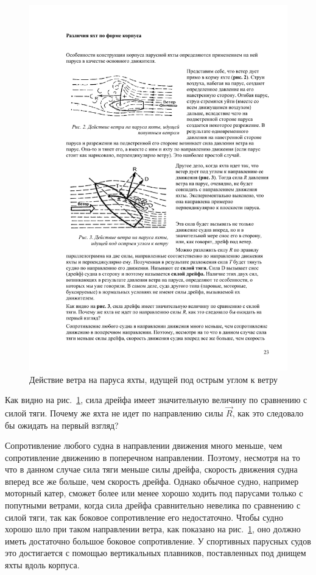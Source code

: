 \documentclass[a4paper, 12pt, twoside, final]{scrbook}
\begin{document}
\begin{figure}%
\centering
\includegraphics{pics/Deystvie_vetra_ostryy_ugol}
\protect\caption{\label{fig:Deystvie_vetra_ostryy_ugol}Действие
ветра на паруса яхты, идущей под острым углом к ветру}
\end{figure}%

Как видно на рис.~\ref{fig:Deystvie_vetra_ostryy_ugol},
сила дрейфа имеет значительную величину по сравнению с силой тяги.
Почему же яхта не идет по направлению силы $\overrightarrow{R}$, как это следовало
бы ожидать на первый взгляд?

Сопротивление любого судна в направлении движения много меньше, чем
сопротивление движению в поперечном направлении. Поэтому, несмотря
на то что в данном случае сила тяги меньше силы дрейфа, скорость движения
судна вперед все же больше, чем скорость дрейфа. Однако обычное судно,
например моторный катер, сможет более или менее хорошо ходить под
парусами только с попутными ветрами, когда сила дрейфа сравнительно
невелика по сравнению с силой тяги, так как боковое сопротивление
его недостаточно. Чтобы судно хорошо шло при таком направлении ветра,
как показано на рис.~\ref{fig:Deystvie_vetra_ostryy_ugol},
оно должно иметь достаточно большое боковое сопротивление. У спортивных
парусных судов это достигается с помощью вертикальных плавников, поставленных
под днищем яхты вдоль корпуса.
\end{document}
